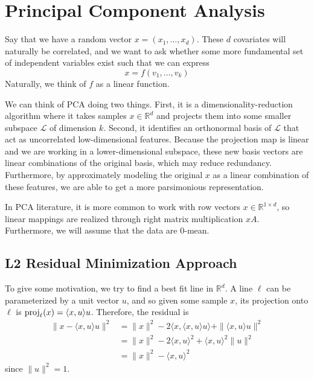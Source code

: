 \section{Principal Component Analysis}  

  Say that we have a random vector $x = (x_1, \ldots, x_d)$. These $d$ covariates will naturally be correlated, and we want to ask whether some more fundamental set of independent variables exist \cite{1933hotelling} such that we can express
  \begin{equation}
    x = f(v_1, \ldots, v_k)
  \end{equation} 
  Naturally, we think of $f$ as a linear function. 

  We can think of PCA doing two things. First, it is a dimensionality-reduction algorithm where it takes samples $x \in \mathbb{R}^d$ and projects them into some smaller subspace $\mathcal{L}$ of dimension $k$. Second, it identifies an orthonormal basis of $\mathcal{L}$ that act as uncorrelated low-dimensional features. Because the projection map is linear and we are working in a lower-dimensional subspace, these new basis vectors are linear combinations of the original basis, which may reduce redundancy. Furthermore, by approximately modeling the original $x$ as a linear combination of these features, we are able to get a more parsimonious representation. 

  In PCA literature, it is more common to work with row vectors $x \in \mathbb{R}^{1 \times d}$, so linear mappings are realized through right matrix multiplication $x A$. Furthermore, we will assume that the data are $0$-mean. 

\subsection{L2 Residual Minimization Approach} 

  To give some motivation, we try to find a best fit line in $\mathbb{R}^d$. A line $\ell$ can be parameterized by a unit vector $u$, and so given some sample $x$, its projection onto $\ell$ is $\operatorname{proj}_{\ell} (x) = \langle x, u\rangle u$. Therefore, the residual is 
  \begin{align}
    \| x - \langle x, u \rangle u \|^2 & = \|x\|^2 - 2 \langle x, \langle x, u \rangle u \rangle + \| \langle x, u \rangle u \|^2 \\ 
                                       & = \|x\|^2 - 2 \langle x, u \rangle^2 + \langle x, u \rangle^2 \|u\|^2 \\ 
                                       & = \|x\|^2 - \langle x, u \rangle^2
  \end{align}
  since $\|u\|^2 = 1$. 

